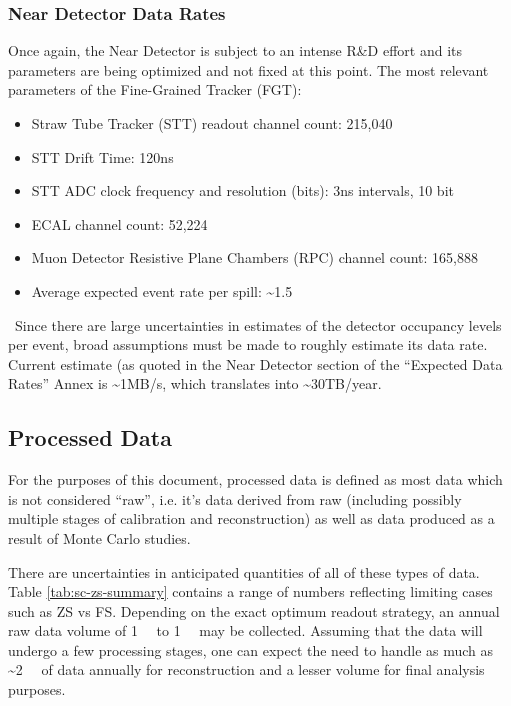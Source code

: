 \subsubsection{Near Detector Data Rates}
Once again, the Near Detector is subject to an intense R\&D effort and its
parameters are being optimized and not fixed at this point. The most relevant parameters
of the Fine-Grained Tracker (FGT):
\begin{itemize}
\item   Straw Tube Tracker (STT) readout channel count: 215,040
\item STT Drift Time: 120ns
\item STT ADC clock frequency and resolution (bits): 3ns intervals, 10 bit
\item ECAL channel count: 52,224
\item Muon Detector Resistive Plane Chambers (RPC) channel count: 165,888
\item Average expected event rate per spill: \textasciitilde 1.5
\end{itemize}
\
Since there are large uncertainties in estimates of the detector occupancy levels per event, 
broad assumptions must be made to roughly estimate its data rate. Current estimate (as quoted in the Near Detector
section of the ``Expected Data Rates'' Annex is \textasciitilde 1MB/s, which translates into \textasciitilde 30TB/year.


\subsection{Processed Data}
\label{sec:detectors-sc-infrastructure-processed-data}
For the purposes of this document, processed data is defined as most data which is not considered ``raw'', i.e. it's data derived from raw (including possibly multiple stages
of calibration and reconstruction) as well as data produced as a result of Monte Carlo studies.

There are uncertainties in anticipated quantities of all of these types of data. Table \ref{tab:sc-zs-summary} contains
a range of numbers reflecting limiting cases such as ZS vs FS.
Depending on the exact optimum readout strategy, an annual raw data volume of
\SI{1}{\tera\byte} to \SI{1}{\peta\byte} may be collected.
Assuming that
the data will undergo a few processing stages, one can expect the need
to handle as much as \textasciitilde \SI{2}{\peta\byte} of data annually for reconstruction and a lesser
volume for final analysis purposes.

